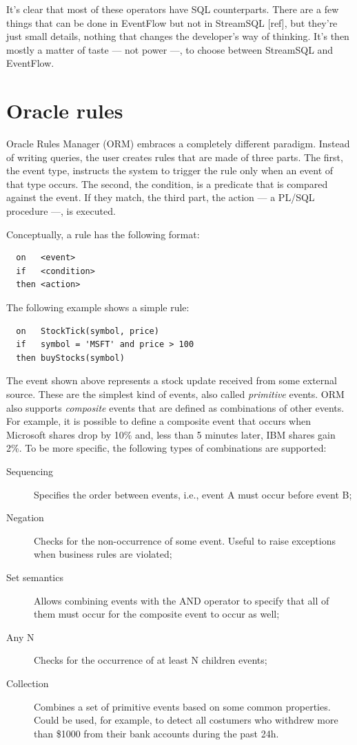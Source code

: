 \documentclass{report}
\begin{document}
It's clear that most of these operators have SQL counterparts. There
are a few things that can be done in EventFlow but not in StreamSQL
[ref], but they're just small details, nothing that changes the
developer's way of thinking. It's then mostly a matter of taste ---
not power ---, to choose between StreamSQL and EventFlow.

\section{Oracle rules}
\label{sec:orm}

Oracle Rules Manager (ORM) embraces a completely different
paradigm. Instead of writing queries, the user creates rules that are
made of three parts. The first, the event type, instructs the system
to trigger the rule only when an event of that type occurs. The
second, the condition, is a predicate that is compared against the
event. If they match, the third part, the action --- a PL/SQL
procedure ---, is executed.

Conceptually, a rule has the following format:

\lstset{
  language=Oracle,
  columns=fullflexible,
  basicstyle=\tt,
  keywordstyle=\bf,
}


\begin{lstlisting}
  on   <event>
  if   <condition>
  then <action>
\end{lstlisting}

The following example shows a simple rule:

\begin{lstlisting}
  on   StockTick(symbol, price)
  if   symbol = 'MSFT' and price > 100
  then buyStocks(symbol)
\end{lstlisting}

The event shown above represents a stock update received from some
external source. These are the simplest kind of events, also called
\emph{primitive} events. ORM also supports \emph{composite} events
that are defined as combinations of other events. For example, it is
possible to define a composite event that occurs when Microsoft shares
drop by 10\% and, less than 5 minutes later, IBM shares gain 2\%. To
be more specific, the following types of combinations are supported:
\begin{description}
\item [Sequencing] Specifies the order between events, i.e., event A
  must occur before event B;
\item [Negation] Checks for the non-occurrence of some event. Useful
  to raise exceptions when business rules are violated;
\item [Set semantics] Allows combining events with the AND operator to
  specify that all of them must occur for the composite event to occur
  as well;
\item [Any N] Checks for the occurrence of at least N children events;
\item [Collection] Combines a set of primitive events based on some
  common properties. Could be used, for example, to detect all
  costumers who withdrew more than \$1000 from their bank accounts
  during the past 24h.
\end{description}
\end{document}
